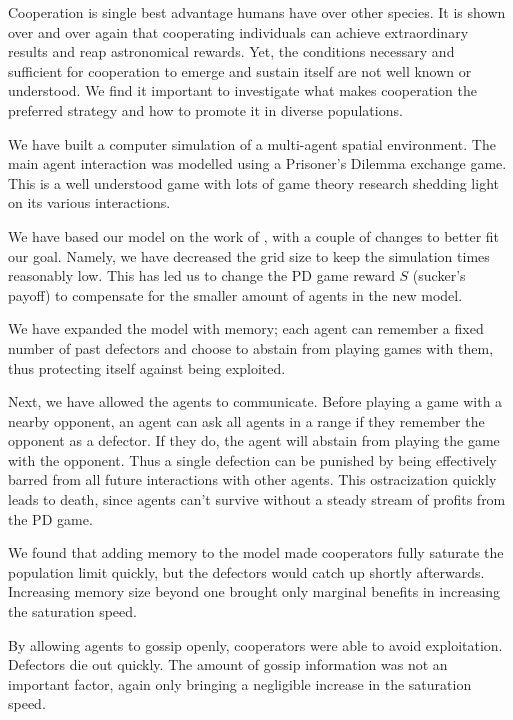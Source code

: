 \documentclass[english]{article}
\begin{document}
Cooperation is single best advantage humans have over other species.
It is shown over and over again that cooperating individuals can achieve extraordinary results and reap astronomical rewards.
Yet, the conditions necessary and sufficient for cooperation to emerge and sustain itself are not well known or understood.
We find it important to investigate what makes cooperation the preferred strategy and how to promote it in diverse populations.

We have built a computer simulation of a multi-agent spatial environment.
The main agent interaction was modelled using a Prisoner's Dilemma exchange game. This is a well understood game with lots of game theory research shedding light on its various interactions.

We have based our model on the work of \citet{smaldino}, with a couple of changes to better fit our goal.
Namely, we have decreased the grid size to keep the simulation times reasonably low.
This has led us to change the PD game reward $S$ (sucker's payoff) to compensate for the smaller amount of agents in the new model.

We have expanded the model with memory; each agent can remember a fixed number of past defectors and choose to abstain from playing games with them, thus protecting itself against being exploited.

Next, we have allowed the agents to communicate. Before playing a game with a nearby opponent, an agent can ask all agents in a range if they remember the opponent as a defector. If they do, the agent will abstain from playing the game with the opponent.
Thus a single defection can be punished by being effectively barred from all future interactions with other agents.
This ostracization quickly leads to death, since agents can't survive without a steady stream of profits from the PD game.

We found that adding memory to the model made cooperators fully saturate the population limit quickly, but the defectors would catch up shortly afterwards.
Increasing memory size beyond one brought only marginal benefits in increasing the saturation speed.

By allowing agents to gossip openly, cooperators were able to avoid exploitation. Defectors die out quickly.
The amount of gossip information was not an important factor, again only bringing a negligible increase in the saturation speed.
\end{document}
